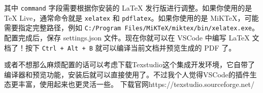 其中 \texttt{command} 字段需要根据你安装的 \LaTeX{} 发行版进行调整。如果你使用的是 TeX Live，通常命令就是 \texttt{xelatex} 和 \texttt{pdflatex}。如果你使用的是 MiKTeX，可能需要指定完整路径，例如 \texttt{C:/Program Files/MiKTeX/miktex/bin/xelatex.exe}。
配置完成后，保存 settings.json 文件。现在你就可以在 VSCode 中编写 \LaTeX{} 文档了！按下 \texttt{Ctrl + Alt + B} 就可以编译当前文档并预览生成的 PDF 了。

或者不想那么麻烦配置的话可以考虑下载Texstudio这个集成开发环境，它自带了编译器和预览功能，安装后就可以直接使用了。不过我个人觉得VSCode的插件生态更丰富，使用起来也更灵活一些。
下载官网https://texstudio.sourceforge.net/